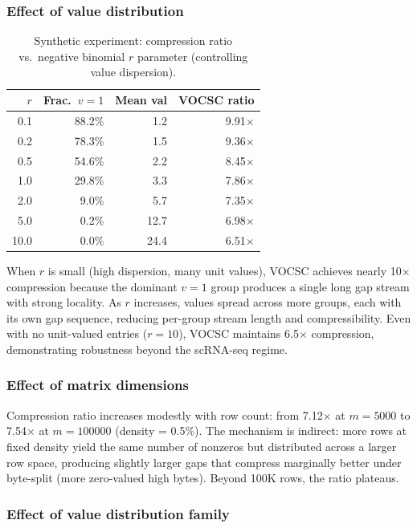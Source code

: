 \documentclass[10pt,twocolumn,letterpaper]{article}
\begin{document}
\subsubsection{Effect of value distribution}

\begin{table}[t]
\centering
\caption{Synthetic experiment: compression ratio vs.\ negative binomial $r$ parameter (controlling value dispersion).}
\label{tab:nb}
\footnotesize
\begin{tabular}{rrrr}
\toprule
$r$ & Frac.\ $v{=}1$ & Mean val & VOCSC ratio \\
\midrule
0.1 & 88.2\% &  1.2 &  9.91$\times$ \\
0.2 & 78.3\% &  1.5 &  9.36$\times$ \\
0.5 & 54.6\% &  2.2 &  8.45$\times$ \\
1.0 & 29.8\% &  3.3 &  7.86$\times$ \\
2.0 &  9.0\% &  5.7 &  7.35$\times$ \\
5.0 &  0.2\% & 12.7 &  6.98$\times$ \\
10.0 & 0.0\% & 24.4 &  6.51$\times$ \\
\bottomrule
\end{tabular}
\end{table}

When $r$ is small (high dispersion, many unit values), VOCSC achieves nearly 10$\times$ compression because the dominant $v{=}1$ group produces a single long gap stream with strong locality.
As $r$ increases, values spread across more groups, each with its own gap sequence, reducing per-group stream length and compressibility.
Even with no unit-valued entries ($r = 10$), VOCSC maintains 6.5$\times$ compression, demonstrating robustness beyond the scRNA-seq regime.

\subsubsection{Effect of matrix dimensions}

Compression ratio increases modestly with row count: from 7.12$\times$ at $m = 5000$ to 7.54$\times$ at $m = 100000$ (density = 0.5\%).
The mechanism is indirect: more rows at fixed density yield the same number of nonzeros but distributed across a larger row space, producing slightly larger gaps that compress marginally better under byte-split (more zero-valued high bytes).
Beyond 100K rows, the ratio plateaus.

\subsubsection{Effect of value distribution family}
\end{document}
